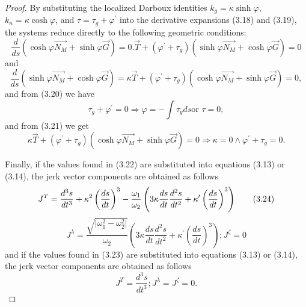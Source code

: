 \documentclass[10pt,a4paper]{amsart}
\begin{document}
\begin{proof}
By substituting the localized Darboux identities $k_{g} = \kappa \sinh \varphi$, $k_{n} = \kappa \cosh \varphi$, and $\tau = \tau_{g} + \varphi^{\prime}$ into the derivative expansions (3.18) and (3.19), the systems reduce directly to the following geometric conditions:
\begin{equation}
\frac{d}{ds}\left( \cosh \varphi \overrightarrow{N_{M}}+\sinh \varphi 
\overrightarrow{G}\right) =0.\overrightarrow{T}+(\varphi ^{\prime }+\tau
_{g})\left( \sinh \varphi \overrightarrow{N_{M}}+\cosh \varphi 
\overrightarrow{G}\right) =0  \tag{3.20}
\end{equation}%
and 
\begin{equation}
\frac{d}{ds}\left( \sinh \varphi \overrightarrow{N_{M}}+\cosh \varphi 
\overrightarrow{G}\right) =\kappa \overrightarrow{T}+(\varphi ^{\prime
}+\tau _{g})\left( \cosh \varphi \overrightarrow{N_{M}}+\sinh \varphi 
\overrightarrow{G}\right) =0,  \tag{3.21}
\end{equation}%
and from (3.20) we have 
\begin{equation}
\tau _{g}+\varphi ^{\prime }=0\Rightarrow \varphi =-\int \tau _{g}ds\text{
or }\tau =0,  \tag{3.22}
\end{equation}%
and from (3.21) we get 
\begin{equation}
\kappa \overrightarrow{T}+(\varphi ^{\prime }+\tau _{g})\left( \cosh \varphi 
\overrightarrow{N_{M}}+\sinh \varphi \overrightarrow{G}\right) =0\Rightarrow
\kappa =0\wedge \varphi ^{\prime }+\tau _{g}=0.  \tag{3.23}
\end{equation}

Finally, if the values found in (3.22) are substituted into equations (3.13)
or (3.14), the jerk vector components are obtained as follows%
\begin{equation}
J^{T}=\frac{d^{3}s}{dt^{3}}+\kappa ^{2}\left( \frac{ds}{dt}\right) ^{3}-%
\frac{\omega _{1}}{\omega _{2}}\left( 3\kappa \frac{ds}{dt}\frac{d^{2}s}{%
dt^{2}}+\kappa ^{\prime }\left( \frac{ds}{dt}\right) ^{3}\right)  \tag{3.24}
\end{equation}%
\begin{equation}
J^{\lambda }=\frac{\sqrt{\vert\omega _{1}^{2}-\omega _{2}^{2}\vert}}{\omega _{2}}%
(3\kappa \frac{ds}{dt}\frac{d^{2}s}{dt^{2}}+\kappa ^{\prime }\left( \frac{ds%
}{dt}\right) ^{3});J^{\zeta }=0  \tag{3.25}
\end{equation}%
and if the values {}{}found in (3.23) are substituted into equations (3.13)
or (3.14), the jerk vector components are obtained as follows%
\begin{equation}
J^{T}=\frac{d^{3}s}{dt^{3}};J^{\lambda }=J^{\zeta }=0.  \tag{3.26}
\end{equation}


\end{proof}
\end{document}
